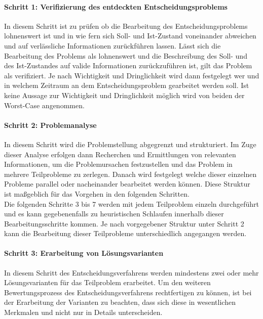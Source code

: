 \paragraph{Schritt 1: Verifizierung des entdeckten Entscheidungsproblems} In diesem Schritt ist zu prüfen ob die Bearbeitung des Entscheidungsproblems lohnenswert ist und in wie fern sich Soll- und Ist-Zustand voneinander abweichen und auf verlässliche Informationen zurückführen lassen. Lässt sich die Bearbeitung des Problems als lohnenswert und die Beschreibung des Soll- und des Ist-Zustandes auf valide Informationen zurückzuführen ist, gilt das Problem als verifiziert. Je nach Wichtigkeit und Dringlichkeit wird dann festgelegt wer und in welchem Zeitraum an dem Entscheidungsproblem gearbeitet werden soll. Ist keine Aussage zur Wichtigkeit und Dringlichkeit möglich wird von beiden der Worst-Case angenommen.
\vspace*{-2.5mm}
\paragraph{Schritt 2: Problemanalyse} In diesem Schritt wird die Problemstellung abgegrenzt und strukturiert. Im Zuge dieser Analyse erfolgen dann Recherchen und Ermittlungen von relevanten Informationen, um die Problemursachen festzustellen und das Problem in mehrere Teilprobleme zu zerlegen. Danach wird festgelegt welche dieser einzelnen Probleme parallel oder nacheinander bearbeitet werden können. Diese Struktur ist maßgeblich für das Vorgehen in den folgenden Schritten.\\

Die folgenden Schritte 3 bis 7 werden mit jedem Teilproblem einzeln durchgeführt und es kann gegebenenfalls zu heuristischen Schlaufen innerhalb dieser Bearbeitungsschritte kommen. Je nach vorgegebener Struktur unter Schritt 2 kann die Bearbeitung dieser Teilprobleme unterschiedlich angegangen werden.
\vspace*{-2.5mm}
\paragraph{Schritt 3: Erarbeitung von Lösungsvarianten} In diesem Schritt des Entscheidungsverfahrens werden mindestens zwei oder mehr Lösungsvarianten für das Teilproblem erarbeitet. Um den weiteren Bewertungsprozess des Entscheidungsverfahrens rechtfertigen zu können, ist bei der Erarbeitung der Varianten zu beachten, dass sich diese in wesentlichen Merkmalen und nicht nur in Details unterscheiden. 
\vspace*{-2.5mm}
